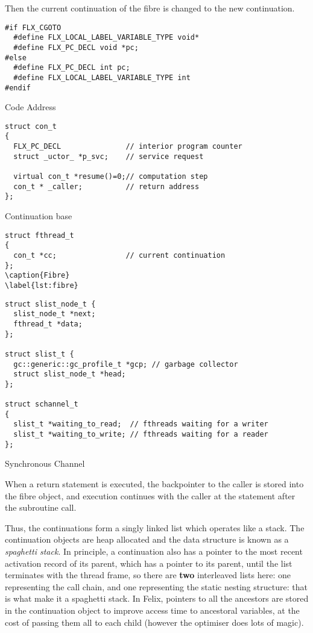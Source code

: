 \documentclass[oneside]{book}
\begin{document}
Then the current continuation of the fibre is 
changed to the new continuation.

\begin{listing}
\begin{verbatim}
#if FLX_CGOTO
  #define FLX_LOCAL_LABEL_VARIABLE_TYPE void*
  #define FLX_PC_DECL void *pc;
#else
  #define FLX_PC_DECL int pc;
  #define FLX_LOCAL_LABEL_VARIABLE_TYPE int
#endif

\end{verbatim}
\caption{Code Address}
\label{lst:code address}
\end{listing}

\begin{listing}
\begin{verbatim}
struct con_t 
{
  FLX_PC_DECL               // interior program counter
  struct _uctor_ *p_svc;    // service request

  virtual con_t *resume()=0;// computation step
  con_t * _caller;          // return address
};
\end{verbatim}
\caption{Continuation base}
\label{lst:continuation base}
\end{listing}

\begin{listing}
\begin{verbatim}
struct fthread_t 
{
  con_t *cc;                // current continuation
};
\caption{Fibre}
\label{lst:fibre}
\end{verbatim}
\end{listing}

\begin{listing}
\begin{verbatim}
struct slist_node_t {
  slist_node_t *next;
  fthread_t *data;
};

struct slist_t {
  gc::generic::gc_profile_t *gcp; // garbage collector
  struct slist_node_t *head;
};

struct schannel_t
{
  slist_t *waiting_to_read;  // fthreads waiting for a writer
  slist_t *waiting_to_write; // fthreads waiting for a reader
};
\end{verbatim}
\caption{Synchronous Channel}
\label{lst:synchronous channel}
\end{listing}

When a return statement is executed, the backpointer to the
caller is stored into the fibre object, and execution continues
with the caller at the statement after the subroutine call.

Thus, the continuations form a singly linked list which operates
like a stack. The continuation objects are heap allocated and
the data structure is known as a {\em spaghetti stack}.
In principle, a continuation also has a pointer to the most recent
activation record of its parent, which has a pointer to its 
parent, until the list terminates with the thread frame,
so there are {\bf two} interleaved lists here: one representing
the call chain, and one representing the static nesting structure:
that is what make it a spaghetti stack. In Felix, pointers to all
the ancestors are stored in the continuation object to improve
access time to ancestoral variables, at the cost of passing them
all to each child (however the optimiser does lots of magic).
\end{document}
